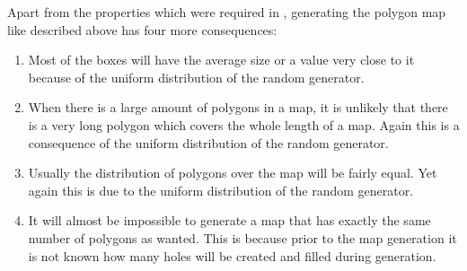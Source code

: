 \begin{figure}[hbt]
   \begin{center}
      \hspace*{4ex}
      \hspace*{4ex}
      \hspace*{6ex}
   \end{center}
\end{figure} 

Apart from the properties which were required in
,
generating the polygon map like described above has four more
consequences:
\begin{enumerate}
  \vspace*{-1ex}
  \item Most of the boxes will have the average size or a
    value very close to it because of the uniform distribution
    of the random generator.

  \item When there is a large amount of polygons in a map, it
    is unlikely that there is a very long polygon which covers
    the whole length of a map.
    Again this is a consequence of the uniform distribution of
    the random generator.

  \item Usually the distribution of polygons over the map will be
    fairly equal.
    Yet again this is due to the uniform distribution of the random
    generator.

  \item It will almost be impossible to generate a map that has
    exactly the same number of polygons as wanted.
    This is because prior to the map generation it is not known how
    many holes will be created and filled during generation.
\end{enumerate}



